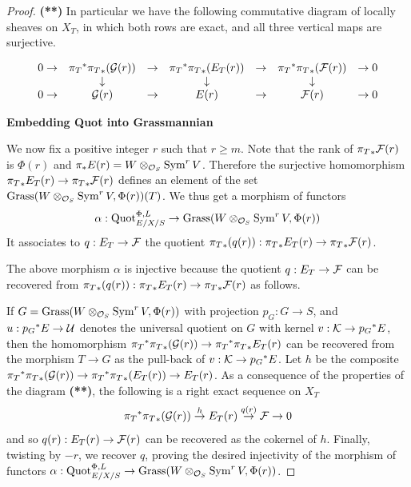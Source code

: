\begin{proof}
\textbf{(**) }
In particular we have the following commutative diagram
of locally sheaves on $X_T$, in which both rows are exact, and all
three vertical maps are surjective.

$$\begin{array}{ccccccc}
0  \to & {\pi_T}^*{\pi_T}_*(\mathcal{G}(r)) & \to
& {\pi_T}^*{\pi_T}_* (E_T(r)) &
\to  &{\pi_T}^*{\pi_T}_* (\mathcal{F}(r))& \to   0\\
       & \downarrow                &     & \downarrow                &
     & \downarrow               &        \\
0  \to & \mathcal{G}(r)                  & \to & E(r) &
\to  & \mathcal{F}(r)                 & \to   0
\end{array}$$

\bigskip


\centerline{\large\bf Embedding Quot into Grassmannian}

\medskip

We now fix a positive integer $r$ such that $r\ge m$.
Note that the rank of ${\pi_T}_*\mathcal{F}(r)$ is $\Phi(r)$
and $\pi_*E(r) = W \otimes_{{\mathcal O}_S}\operatorname{Sym}^r V$.
Therefore the surjective homomorphism
${\pi_T}_*E_T(r) \to {\pi_T}_*\mathcal{F}(r)$
defines an element of the set
$\operatorname{Grass}( W \otimes_{{\mathcal O}_S}\operatorname{Sym}^r V , \Phi(r))(T)$.
We thus get a morphism of functors
$$\alpha : \operatorname{Quot}^{\Phi,L}_{E/X/S} \to
\operatorname{Grass}( W \otimes_{{\mathcal O}_S}\operatorname{Sym}^r V, \Phi(r))$$
It associates to $q: E_T \to \mathcal{F}$ the quotient
${\pi_T}_*(q(r)) : {\pi_T}_*E_T(r) \to {\pi_T}_*\mathcal{F}(r)$.

The above morphism $\alpha$ is injective because the quotient
$q: E_T \to \mathcal{F}$ can be recovered from
${\pi_T}_*(q(r)) : {\pi_T}_*E_T(r) \to {\pi_T}_*\mathcal{F}(r)$
as follows.

If $G = \operatorname{Grass}( W \otimes_{{\mathcal O}_S}\operatorname{Sym}^r V, \Phi(r))$ with
projection $p_G : G \to S$, and
$u : {p_G}^*E \to \mathcal{U}$ denotes the universal quotient on $G$
with kernel $v : \mathcal{K} \to {p_G}^*E$,
then the homomorphism
${\pi_T}^*{\pi_T}_*(\mathcal{G}(r))\to {\pi_T}^*{\pi_T}_*E_T(r)$
can be recovered
from the morphism $T \to G$ as
the pull-back of $v : \mathcal{K} \to {p_G}^*E$.
Let $h$ be  the composite
${\pi_T}^*{\pi_T}_*(\mathcal{G}(r))\to {\pi_T}^*{\pi_T}_*(E_T(r))\to E_T(r)$.
As a consequence of the properties of the diagram \textbf{(**)},
the following is a right exact sequence on $X_T$
$${\pi_T}^*{\pi_T}_*(\mathcal{G}(r))\stackrel{h}{\to}
E_T(r) \stackrel{q(r)}{\to} \mathcal{F} \to 0$$
and so $q(r) : E_T(r) \to \mathcal{F}(r)$ can be recovered as the cokernel of $h$.
Finally, twisting by $-r$, we recover $q$, proving the desired
injectivity of the morphism of functors
$\alpha :\operatorname{Quot}^{\Phi,L}_{E/X/S} \to
\operatorname{Grass}( W \otimes_{{\mathcal O}_S}\operatorname{Sym}^r V, \Phi(r))$.




\end{proof}
